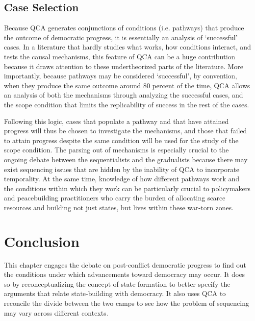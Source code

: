 \documentclass [11pt]{article}
\begin{document}
\subsection*{Case Selection}

Because QCA generates conjunctions of conditions (i.e. pathways) that produce the outcome of democratic progress, it is essentially an analysis of `successful' cases. In a literature that hardly studies what works, how conditions interact, and tests the causal mechanisms, this feature of QCA can be a huge contribution because it draws attention to these undertheorized parts of the literature. More importantly, because pathways may be considered `successful', by convention, when they produce the same outcome around 80 percent of the time, QCA allows an analysis of both the mechanisms through analyzing the successful cases, and the scope condition that limits the replicability of success in the rest of the cases.

Following this logic, cases that populate a pathway and that have attained progress will thus be chosen to investigate the mechanisms, and those that failed to attain progress despite the same condition will be used for the study of the scope condition. The parsing out of mechanisms is especially crucial to the ongoing debate between the sequentialists and the gradualists because there may exist sequencing issues that are hidden by the inability of QCA to incorporate temporality. At the same time, knowledge of how different pathways work and the conditions within which they work can be particularly crucial to policymakers and peacebuilding practitioners who carry the burden of allocating scarce resources and building not just states, but lives within these war-torn zones.

\section*{Conclusion}

This chapter engages the debate on post-conflict democratic progress to find out the conditions under which advancements toward democracy may occur. It does so by reconceptualizing the concept of state formation to better specify the arguments that relate state-building with democracy. It also uses QCA to reconcile the divide between the two camps to see how the problem of sequencing may vary across different contexts.
\end{document}
